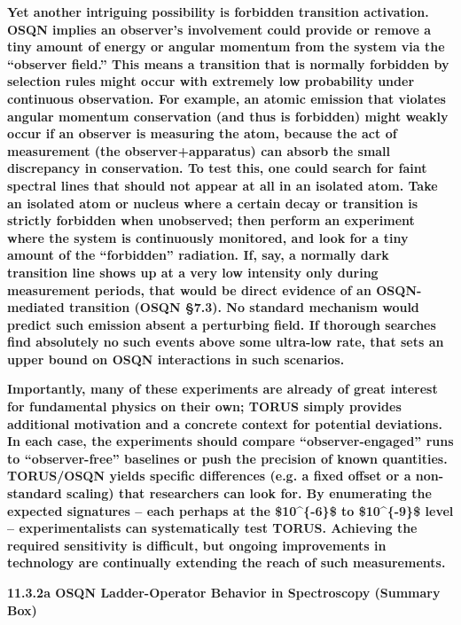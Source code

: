 \documentclass[]{article}
\begin{document}
\textbf{Yet another intriguing possibility is forbidden transition
activation. OSQN implies an observer's involvement could provide or
remove a tiny amount of energy or angular momentum from the system via
the ``observer field.'' This means a transition that is normally
forbidden by selection rules might occur with extremely low probability
under continuous observation. For example, an atomic emission that
violates angular momentum conservation (and thus is forbidden) might
weakly occur if an observer is measuring the atom, because the act of
measurement (the observer+apparatus) can absorb the small discrepancy in
conservation. To test this, one could search for faint spectral lines
that should not appear at all in an isolated atom. Take an isolated atom
or nucleus where a certain decay or transition is strictly forbidden
when unobserved; then perform an experiment where the system is
continuously monitored, and look for a tiny amount of the ``forbidden''
radiation. If, say, a normally dark transition line shows up at a very
low intensity only during measurement periods, that would be direct
evidence of an OSQN-mediated transition (OSQN §7.3). No standard
mechanism would predict such emission absent a perturbing field. If
thorough searches find absolutely no such events above some ultra-low
rate, that sets an upper bound on OSQN interactions in such scenarios.}

\textbf{Importantly, many of these experiments are already of great
interest for fundamental physics on their own; TORUS simply provides
additional motivation and a concrete context for potential deviations.
In each case, the experiments should compare ``observer-engaged'' runs
to ``observer-free'' baselines or push the precision of known
quantities. TORUS/OSQN yields specific differences (e.g. a fixed offset
or a non-standard scaling) that researchers can look for. By enumerating
the expected signatures -- each perhaps at the \$10\^{}\{-6\}\$ to
\$10\^{}\{-9\}\$ level -- experimentalists can systematically test
TORUS. Achieving the required sensitivity is difficult, but ongoing
improvements in technology are continually extending the reach of such
measurements.}

\textbf{11.3.2a OSQN Ladder-Operator Behavior in Spectroscopy (Summary
Box)}
\end{document}
